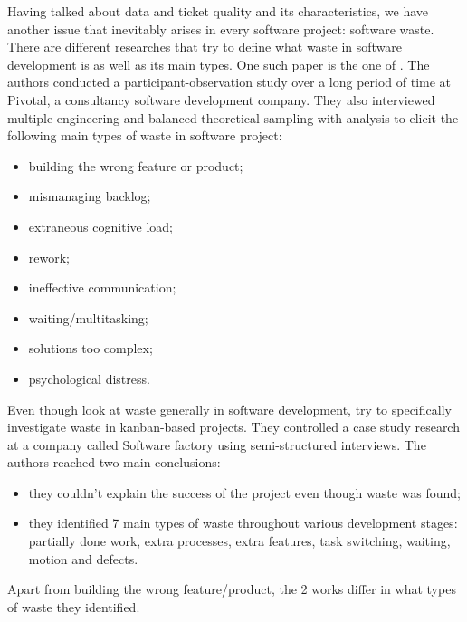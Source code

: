 \documentclass{mprop}
\begin{document}
Having talked about data and ticket quality and its characteristics, we have 
another issue that inevitably arises in every software project: software waste. 
There are different researches that try to define what waste in software 
development is as well as its main types. One such paper is the one of 
\citet{sedano2017software}. The authors conducted a participant-observation 
study over a long period of time at Pivotal, a consultancy software development
company. They also interviewed multiple engineering and balanced theoretical 
sampling with analysis to elicit the following main types of waste in software
project:
  \begin{itemize}
    \item building the wrong feature or product;
    \item mismanaging backlog;
    \item extraneous cognitive load;
    \item rework;
    \item ineffective communication;
    \item waiting/multitasking;
    \item solutions too complex;
    \item psychological distress.
  \end{itemize}

Even though \citet{sedano2017software} look at waste generally in software 
development, \citet{ikonen2010exploring} try to specifically investigate waste
in kanban-based projects. They controlled a case study research at a company 
called Software factory using semi-structured interviews. The authors reached
two main conclusions:
  \begin{itemize}
    \item they couldn't explain the success of the project even though waste was 
      found;
    \item they identified 7 main types of waste throughout various development
      stages: partially done work, extra processes, extra features, task 
      switching, waiting, motion and defects.
  \end{itemize}
Apart from building the wrong feature/product, the 2 works differ in what types
of waste they identified.
\end{document}
